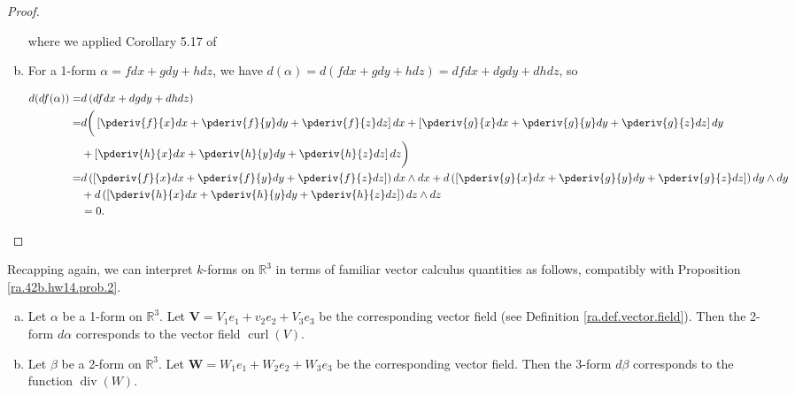 \begin{proof}
\begin{enumerate}[(a)]
where we applied Corollary 5.17 of \citet{pugh2015real}



\item 

For a 1-form \(\alpha = f dx + gdy + hdz\), we have \(d(\alpha )= d(f dx + gdy + hdz) = df dx + dgdy + dhdz\), so

\begin{align*}
d(df(\alpha)) = & d \left(  df dx + dgdy + dhdz\right) 
\\ = & d \bigg(  \left[\pderiv{f}{x} dx + \pderiv{f}{y} dy + \pderiv{f}{z} dz \right] dx + \left[ \pderiv{g}{x} dx + \pderiv{g}{y} dy + \pderiv{g}{z} dz \right] dy 
\\ & + \left[ \pderiv{h}{x} dx + \pderiv{h}{y} dy + \pderiv{h}{z} dz \right] dz\bigg) 
\\ = & d \left(  \left[\pderiv{f}{x} dx + \pderiv{f}{y} dy + \pderiv{f}{z} dz \right] \right) dx \wedge dx + d \left( \left[ \pderiv{g}{x} dx + \pderiv{g}{y} dy + \pderiv{g}{z} dz \right] \right) dy \wedge dy 
\\ & + d \left( \left[ \pderiv{h}{x} dx + \pderiv{h}{y} dy + \pderiv{h}{z} dz \right]  \right) dz \wedge dz
\\ & = 0.
\end{align*}

\end{enumerate}

\end{proof}

Recapping again, we can interpret \(k\)-forms on \(\mathbb{R}^3\) in terms of familiar vector calculus quantities as follows, compatibly with Proposition \ref{ra.42b.hw14.prob.2}.

\begin{proposition}\label{ra.42b.hw14.prob.5}

\begin{enumerate}[(a)]

\item

Let \(\alpha\) be a 1-form on \(\mathbb{R}^3\). Let \(\boldsymbol{V} = V_1 e_1 + v_2 e_2 + V_3 e_3\) be the corresponding vector field (see Definition \ref{ra.def.vector.field}). Then the 2-form \(d \alpha\) corresponds to the vector field \(\operatorname{curl}(V)\).


\item Let \(\beta\) be a 2-form on \(\mathbb{R}^3\). Let \(\boldsymbol{W} = W_1 e_1 + W_2 e_2 + W_3 e_3\) be the corresponding vector field. Then the 3-form \(d \beta\) corresponds to the function \(\operatorname{div}(W)\).

\end{enumerate}

\end{proposition}

